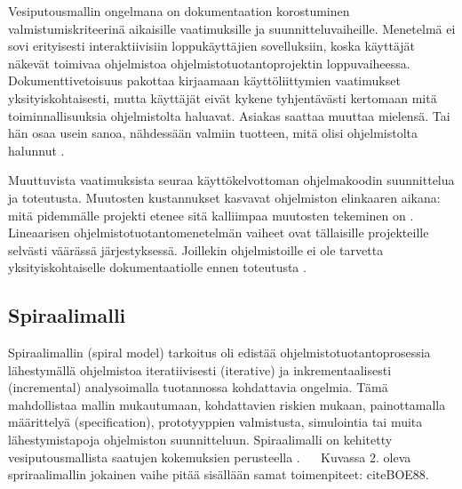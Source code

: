 \documentclass[finnish]{tktltiki2}
\theoremstyle{definition}
\theoremstyle{remark}
\begin{document}
Vesiputousmallin ongelmana on dokumentaation korostuminen valmistumiskriteerinä aikaisille vaatimuksille ja suunnitteluvaiheille. Menetelmä ei sovi erityisesti interaktiivisiin loppukäyttäjien sovelluksiin, koska käyttäjät näkevät toimivaa ohjelmistoa ohjelmistotuotantoprojektin loppuvaiheessa. Dokumenttivetoisuus pakottaa kirjaamaan käyttö\-liittymien vaatimukset yksityiskohtaisesti, mutta käyttäjät eivät kykene tyhjentävästi kertomaan mitä toiminnallisuuksia ohjelmistolta haluavat. Asiakas saattaa muuttaa mielensä. Tai hän osaa usein sanoa, nähdessään valmiin tuotteen, mitä olisi ohjelmistolta halunnut \cite{BEC99}.

Muuttuvista vaatimuksista seuraa käyttökelvottoman ohjelmakoodin suunnittelua ja toteutusta. Muutosten kustannukset kasvavat ohjelmiston elinkaaren aikana: mitä pidemmälle projekti etenee sitä kalliimpaa muutosten tekeminen on \cite{HIC01}. Lineaarisen ohjelmistotuotantomenetelmän vaiheet ovat tällaisille projekteille selvästi väärässä järjestyksessä. Joillekin ohjelmistoille ei ole tarvetta yksityiskohtaiselle dokumentaatiolle ennen toteutusta \cite{BOE88}.


\subsection{Spiraalimalli}

Spiraalimallin (spiral model) tarkoitus oli edistää ohjelmistotuotantoprosessia lähestymällä ohjelmistoa iteratiivisesti (iterative) ja inkrementaalisesti (incremental) analysoimalla tuotannossa kohdattavia ongelmia. Tämä mahdollistaa mallin mukautumaan, kohdattavien riskien mukaan, painottamalla määrittelyä (specification), prototyyppien valmistusta, simulointia tai muita lähestymistapoja ohjelmiston suunnitteluun. Spiraalimalli on kehitetty vesiputousmallista saatujen kokemuksien perusteella \cite{BOE88}.
　
Kuvassa 2. oleva spriraalimallin jokainen vaihe pitää sisällään samat toimenpiteet: cite{BOE88}.
\end{document}

